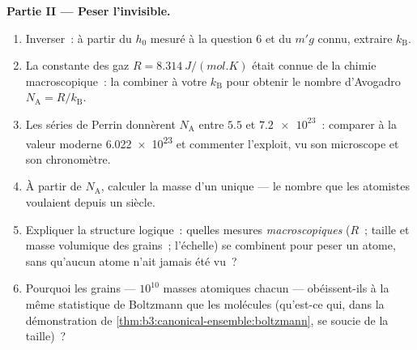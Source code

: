 \begin{problem}
\medskip\noindent\textbf{Partie II --- Peser l'invisible.}
\begin{enumerate}[resume]
  \item Inverser~: à partir du $h_0$ mesuré à la question 6 et du
        $m'g$ connu, extraire $k_{\text{B}}$.
  \item La constante des gaz $R = \qty{8.314}{J/(mol.K)}$ était
        connue de la chimie macroscopique~: la combiner à votre
        $k_{\text{B}}$ pour obtenir le nombre d'Avogadro $N_{\text{A}} =
        R/k_{\text{B}}$.
  \item Les séries de Perrin donnèrent $N_{\text{A}}$ entre $5.5$ et
        $\num{7.2e23}$~: comparer à la valeur moderne
        \num{6.022e23} et commenter l'exploit, vu son microscope et
        son chronomètre.
  \item À partir de $N_{\text{A}}$, calculer la masse d'un unique
         --- le nombre que les atomistes voulaient
        depuis un siècle.
  \item Expliquer la structure logique~: quelles mesures
        \emph{macroscopiques} ($R$~; taille et masse volumique des
        grains~; l'échelle) se combinent pour peser un atome, sans
        qu'aucun atome n'ait jamais été vu~?
  \item Pourquoi les grains --- $10^{10}$ masses atomiques chacun ---
        obéissent-ils à la même statistique de Boltzmann que les
        molécules (qu'est-ce qui, dans la démonstration de
        \cref{thm:b3:canonical-ensemble:boltzmann}, se soucie de la
        taille)~?
\end{enumerate}


\end{problem}
